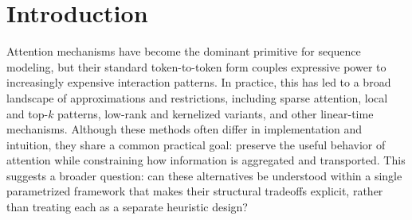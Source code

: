 \documentclass{article}
\theoremstyle{plain}
\theoremstyle{definition}
\theoremstyle{remark}
\begin{document}
\printAffiliationsAndNotice{}  %

\begin{abstract}
We introduce Set Attention, a sequence modeling architecture that replaces token-to-token attention with a structured pipeline of set construction, probabilistic pooling, set-level processing, and multi-head routing back to tokens. We develop a tiered theoretical framework separating exact structural properties, mechanistic bounds under smoothness assumptions, and empirically testable corollaries for stable operation.

Structurally, we show that multi-head routing strictly enlarges the function class over single-head routing, with capacity growing linearly with the number of heads until limited by topology. We also characterize routing entropy, top-$k$ constraints, and topology-induced degeneracies. Mechanistically, we decompose loss perturbation into pooling, set-processing, and routing terms, relating gradient flow to Lipschitz constants. This yields a feasible operating region governed by topology, temperature, and gradient transport.

Controlled language-modeling experiments confirm the predicted failure modes, including routing collapse and pooling concentration. Together, these results provide a principled foundation for designing and scaling set-based alternatives to attention.
\end{abstract}

\section{Introduction}

Attention mechanisms have become the dominant primitive for sequence modeling, but their standard token-to-token form couples expressive power to increasingly expensive interaction patterns. In practice, this has led to a broad landscape of approximations and restrictions, including sparse attention, local and top-$k$ patterns, low-rank and kernelized variants, and other linear-time mechanisms. Although these methods often differ in implementation and intuition, they share a common practical goal: preserve the useful behavior of attention while constraining how information is aggregated and transported. This suggests a broader question: can these alternatives be understood within a single parametrized framework that makes their structural tradeoffs explicit, rather than treating each as a separate heuristic design?
\end{document}

